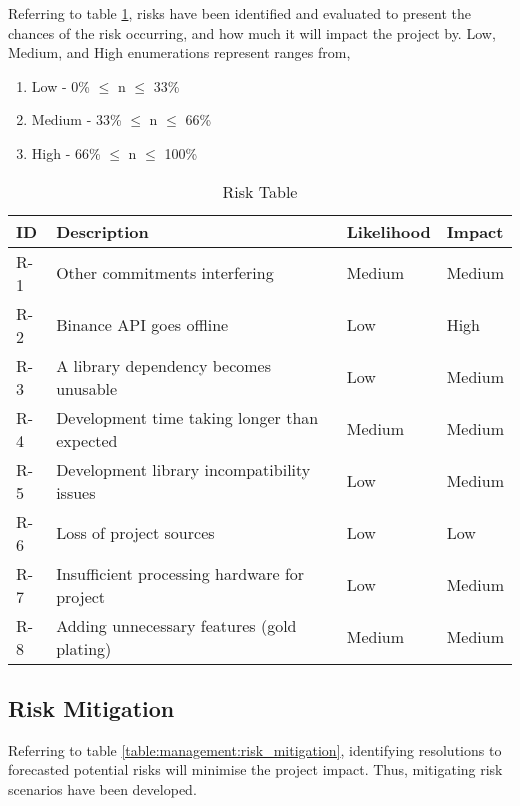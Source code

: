 \noindent Referring to table \ref{table:management:risks}, risks have been identified and evaluated to present the chances of the risk occurring, and how much it will impact the project by. Low, Medium, and High enumerations represent ranges from,
\begin{enumerate}
    \item Low - 0\% $\leq$ n $\leq$ 33\%
    \item Medium - 33\% $\leq$ n $\leq$ 66\%
    \item High - 66\% $\leq$ n $\leq$ 100\%
\end{enumerate}

\begin{table}[htb!]
\centering
\begin{tabular}{|l|p{}|p{}|l|}
\hline
\textbf{ID} & \textbf{Description} & \textbf{Likelihood} & \textbf{Impact} \\ \hline\hline
R-1 & Other commitments interfering & Medium & Medium \\ \hline
R-2 & Binance API goes offline & Low & High \\ \hline
R-3 & A library dependency becomes unusable & Low & Medium \\ \hline
R-4 & Development time taking longer than expected & Medium & Medium \\ \hline
R-5 & Development library incompatibility issues & Low & Medium \\ \hline
R-6 & Loss of project sources & Low & Low \\ \hline
R-7 & Insufficient processing hardware for project  & Low & Medium \\ \hline
R-8 & Adding unnecessary features (gold plating) & Medium & Medium \\ \hline
\end{tabular}
\caption{Risk Table}
\label{table:management:risks}
\end{table}

\subsection{Risk Mitigation}

\noindent Referring to table \ref{table:management:risk_mitigation}, identifying resolutions to forecasted potential risks will minimise the project impact. Thus, mitigating risk scenarios have been developed.

